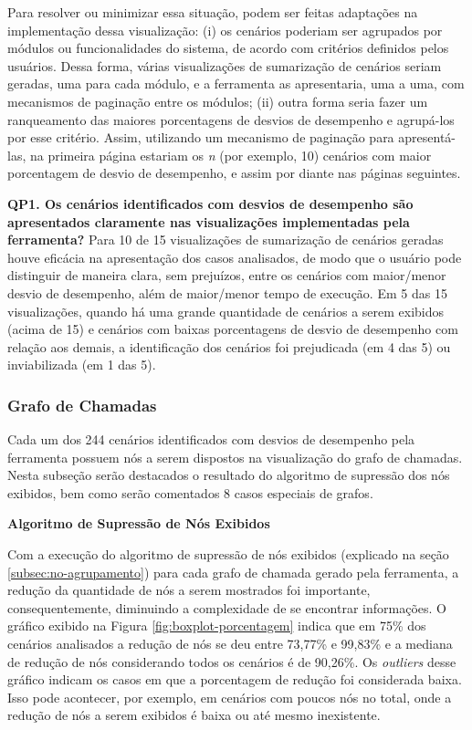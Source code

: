 Para resolver ou minimizar essa situação, podem ser feitas adaptações na implementação dessa visualização: (i) os cenários poderiam ser agrupados por módulos ou funcionalidades do sistema, de acordo com critérios definidos pelos usuários. Dessa forma, várias visualizações de sumarização de cenários seriam geradas, uma para cada módulo, e a ferramenta as apresentaria, uma a uma, com mecanismos de paginação entre os módulos; (ii) outra forma seria fazer um ranqueamento das maiores porcentagens de desvios de desempenho e agrupá-los por esse critério. Assim, utilizando um mecanismo de paginação para apresentá-las, na primeira página estariam os \textit{n} (por exemplo, 10) cenários com maior porcentagem de desvio de desempenho, e assim por diante nas páginas seguintes.

\begin{framed}
  \noindent \textbf{QP1. Os cenários identificados com desvios de desempenho são apresentados claramente nas visualizações implementadas pela ferramenta?} Para 10 de 15 visualizações de sumarização de cenários geradas houve eficácia na apresentação dos casos analisados, de modo que o usuário pode distinguir de maneira clara, sem prejuízos, entre os cenários com maior/menor desvio de desempenho, além de maior/menor tempo de execução. Em 5 das 15 visualizações, quando há uma grande quantidade de cenários a serem exibidos (acima de 15) e cenários com baixas porcentagens de desvio de desempenho com relação aos demais, a identificação dos cenários foi prejudicada (em 4 das 5) ou inviabilizada (em 1 das 5).
\end{framed}

\subsubsection{Grafo de Chamadas} \label{subsec:avaliacao-comportamento-grafo-chamadas}

Cada um dos 244 cenários identificados com desvios de desempenho pela ferramenta possuem nós a serem dispostos na visualização do grafo de chamadas. Nesta subseção serão destacados o resultado do algoritmo de supressão dos nós exibidos, bem como serão comentados 8 casos especiais de grafos.

\hfill

\noindent \textbf{Algoritmo de Supressão de Nós Exibidos}

Com a execução do algoritmo de supressão de nós exibidos (explicado na seção \ref{subsec:no-agrupamento}) para cada grafo de chamada gerado pela ferramenta, a redução da quantidade de nós a serem mostrados foi importante, consequentemente, diminuindo a complexidade de se encontrar informações. O gráfico exibido na Figura \ref{fig:boxplot-porcentagem} indica que em 75\% dos cenários analisados a redução de nós se deu entre 73,77\% e 99,83\% e a mediana de redução de nós considerando todos os cenários é de 90,26\%. Os \textit{outliers} desse gráfico indicam os casos em que a porcentagem de redução foi considerada baixa. Isso pode acontecer, por exemplo, em cenários com poucos nós no total, onde a redução de nós a serem exibidos é baixa ou até mesmo inexistente.

